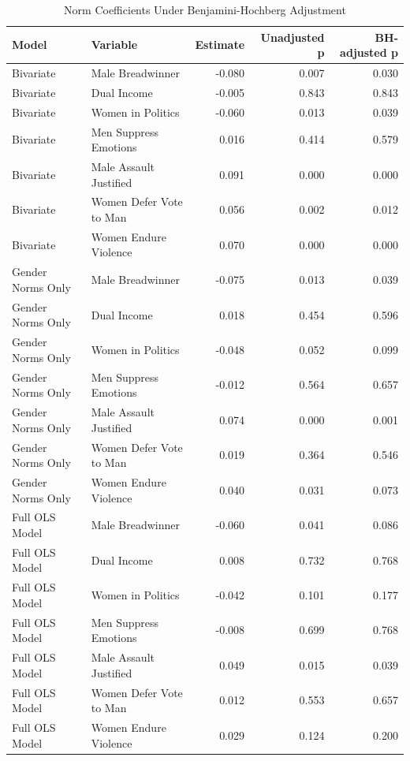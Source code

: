 \begin{table}[!h]
\centering
\caption{Norm Coefficients Under Benjamini-Hochberg Adjustment}
\centering
\begin{tabular}[t]{llrrr}
\toprule
Model & Variable & Estimate & Unadjusted p & BH-adjusted p\\
\midrule
Bivariate & Male Breadwinner & -0.080 & 0.007 & 0.030\\
Bivariate & Dual Income & -0.005 & 0.843 & 0.843\\
Bivariate & Women in Politics & -0.060 & 0.013 & 0.039\\
Bivariate & Men Suppress Emotions & 0.016 & 0.414 & 0.579\\
Bivariate & Male Assault Justified & 0.091 & 0.000 & 0.000\\
Bivariate & Women Defer Vote to Man & 0.056 & 0.002 & 0.012\\
Bivariate & Women Endure Violence & 0.070 & 0.000 & 0.000\\
Gender Norms Only & Male Breadwinner & -0.075 & 0.013 & 0.039\\
Gender Norms Only & Dual Income & 0.018 & 0.454 & 0.596\\
Gender Norms Only & Women in Politics & -0.048 & 0.052 & 0.099\\
Gender Norms Only & Men Suppress Emotions & -0.012 & 0.564 & 0.657\\
Gender Norms Only & Male Assault Justified & 0.074 & 0.000 & 0.001\\
Gender Norms Only & Women Defer Vote to Man & 0.019 & 0.364 & 0.546\\
Gender Norms Only & Women Endure Violence & 0.040 & 0.031 & 0.073\\
Full OLS Model & Male Breadwinner & -0.060 & 0.041 & 0.086\\
Full OLS Model & Dual Income & 0.008 & 0.732 & 0.768\\
Full OLS Model & Women in Politics & -0.042 & 0.101 & 0.177\\
Full OLS Model & Men Suppress Emotions & -0.008 & 0.699 & 0.768\\
Full OLS Model & Male Assault Justified & 0.049 & 0.015 & 0.039\\
Full OLS Model & Women Defer Vote to Man & 0.012 & 0.553 & 0.657\\
Full OLS Model & Women Endure Violence & 0.029 & 0.124 & 0.200\\
\bottomrule
\end{tabular}
\end{table}
